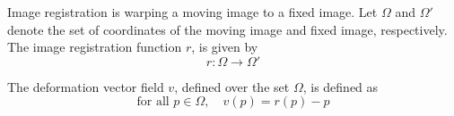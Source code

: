 \documentclass[lettersize,journal]{IEEEtran}
\begin{document}

Image registration is warping a moving image to a fixed image. Let $\Omega$ and $\Omega'$ denote the set of coordinates of the moving image and fixed image, respectively. The image registration function $r$, is given by 
\begin{equation} \label{eq:image_registration_definition}
    r: \Omega \rightarrow \Omega'
\end{equation}

The deformation vector field $v$, defined over the set $\Omega$,  is defined as 
\begin{equation} \label{eq:dvf_definition}
    \text{for all } p \in \Omega, \quad v(p)=r(p)-p
\end{equation}
\end{document}
